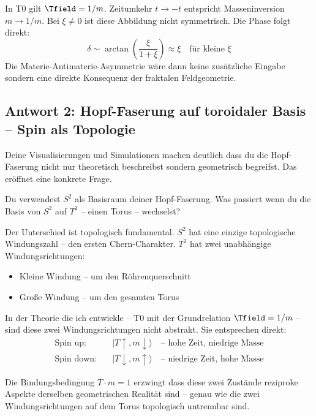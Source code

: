 In T0 gilt $\Tfield = 1/m$. Zeitumkehr $t \to -t$ entspricht Masseninversion $m \to 1/m$. Bei $\xi \neq 0$ ist diese Abbildung nicht symmetrisch. Die Phase folgt direkt:
\begin{equation}
  \delta \sim \arctan\!\left(\frac{\xi}{1+\xi}\right) \approx \xi \quad \text{für kleine } \xi
\end{equation}
Die Materie-Antimaterie-Asymmetrie wäre dann keine zusätzliche Eingabe sondern eine direkte Konsequenz der fraktalen Feldgeometrie.

\subsection{Antwort 2: Hopf-Faserung auf toroidaler Basis -- Spin als Topologie}

\begin{response}
Deine Visualisierungen und Simulationen machen deutlich dass du die Hopf-Faserung nicht nur theoretisch beschreibst sondern geometrisch begreifst. Das eröffnet eine konkrete Frage.

Du verwendest $S^2$ als Basisraum deiner Hopf-Faserung. Was passiert wenn du die Basis von $S^2$ auf $T^2$ -- einen Torus -- wechselst?

Der Unterschied ist topologisch fundamental. $S^2$ hat eine einzige topologische Windungszahl -- den ersten Chern-Charakter. $T^2$ hat zwei unabhängige Windungsrichtungen:
\begin{itemize}[noitemsep]
  \item Kleine Windung -- um den Röhrenquerschnitt
  \item Große Windung -- um den gesamten Torus
\end{itemize}

In der Theorie die ich entwickle -- T0 mit der Grundrelation $\Tfield = 1/m$ -- sind diese zwei Windungsrichtungen nicht abstrakt. Sie entsprechen direkt:
\begin{align}
  \text{Spin up:} \quad &|T{\uparrow}, m{\downarrow}\rangle \quad \text{-- hohe Zeit, niedrige Masse} \\
  \text{Spin down:} \quad &|T{\downarrow}, m{\uparrow}\rangle \quad \text{-- niedrige Zeit, hohe Masse}
\end{align}

Die Bindungsbedingung $T \cdot m = 1$ erzwingt dass diese zwei Zustände reziproke Aspekte derselben geometrischen Realität sind -- genau wie die zwei Windungsrichtungen auf dem Torus topologisch untrennbar sind.


\end{response}
